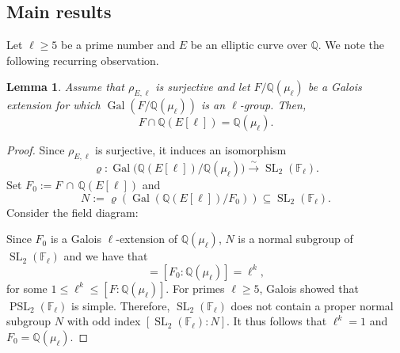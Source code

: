 \documentclass[11pt,reqno]{amsart}
\newtheorem{lemma}[theorem]{Lemma}
\newcommand{\Q}{\mathbb{Q}}
\newcommand{\F}{\mathbb{F}}
\newcommand{\op}[1]{\operatorname{#1}}
\numberwithin{equation}{section}
\begin{document}
\subsection{Main results}
\par Let $\ell\geq 5$ be a prime number and $E$ be an elliptic curve over $\Q$. We note the following recurring observation.
\begin{lemma}\label{PSL2-lemma}
Assume that $\rho_{E,\ell}$ is surjective and let $F/\Q(\mu_\ell)$ be a Galois extension for which $\op{Gal}(F/\Q(\mu_\ell))$ is an $\ell$-group. Then, 
\begin{equation*}
    F \cap \Q(E[\ell]) = \Q(\mu_{\ell}).
\end{equation*}
\end{lemma}
\begin{proof}
Since $\rho_{E,\ell}$ is surjective, it induces an isomorphism \[\varrho: \op{Gal}\big(\Q(E[\ell])/\Q(\mu_{\ell}) \big) \xrightarrow{\sim} \op{SL}_2(\F_{\ell}).\] Set $F_0 := F \, \cap \, \Q(E[\ell])$ and \[N:=\varrho\left(\op{Gal}(\Q(E[\ell])/F_0)\right)  \subseteq \op{SL}_2(\F_{\ell}).\] Consider the field diagram: 
\begin{center}
\end{center}

Since $F_0$ is a Galois $\ell$-extension of $\Q(\mu_\ell)$, $N$ is a normal subgroup of $\op{SL}_2(\F_{\ell})$ and we have that
\begin{equation*}
    [\op{SL}_2(\F_{\ell}): N] = [F_0 : \Q(\mu_{\ell})] = \ell^k,
\end{equation*}
for some $ 1 \leq \ell^k \leq [F:\Q(\mu_{\ell})]$. For primes $\ell\geq 5$, Galois \cite[p.\ 412]{galois1846works} showed that $\op{PSL}_2(\F_\ell)$ is simple. Therefore, $\op{SL}_2(\F_\ell)$ does not contain a proper normal subgroup $N$ with odd index $[\op{SL}_2(\F_\ell):N]$. It thus follows that $\ell^k = 1$ and $F_0 = \Q(\mu_{\ell})$.
\end{proof}
\end{document}
